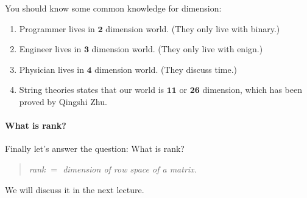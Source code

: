 You should know some common knowledge for dimension:
\begin{enumerate}
\item
Programmer lives in $\bm 2$ dimension world. (They only live with binary.)
\item
Engineer lives in $\bm 3$ dimension world. (They only live with enign.)
\item
Physician lives in $\bm 4$ dimension world. (They discuss time.)
\item
String theories states that our world is $\bm{11}$ or $\bm{26}$ dimension, which has been proved by Qingshi Zhu.
\end{enumerate}
\paragraph{What is rank?}
Finally let's answer the question: What is rank?
\begin{quotation}
\emph{rank $=$ dimension of row space of a matrix.}
\end{quotation}
We will discuss it in the next lecture.





















